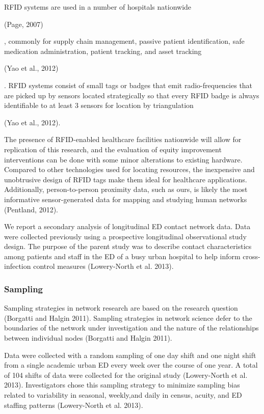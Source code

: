 \documentclass[
]{article}
\begin{document}
RFID systems are used in a number of hospitals nationwide

(Page, 2007)

, commonly for supply chain management, passive patient identification,
safe medication administration, patient tracking, and asset tracking

(Yao et al., 2012)

. RFID systems consist of small tags or badges that emit
radio-frequencies that are picked up by sensors located strategically so
that every RFID badge is always identifiable to at least 3 sensors for
location by triangulation

(Yao et al., 2012).

The presence of RFID-enabled healthcare facilities nationwide will allow
for replication of this research, and the evaluation of equity
improvement interventions can be done with some minor alterations to
existing hardware. Compared to other technologies used for locating
resources, the inexpensive and unobtrusive design of RFID tags make them
ideal for healthcare applications. Additionally, person-to-person
proximity data, such as ours, is likely the most informative
sensor-generated data for mapping and studying human networks (Pentland,
2012).

We report a secondary analysis of longitudinal ED contact network data.
Data were collected previously using a prospective longitudinal
observational study design. The purpose of the parent study was to
describe contact characteristics among patients and staff in the ED of a
busy urban hospital to help inform cross-infection control measures
(Lowery-North et al. 2013).

\hypertarget{sampling}{%
\subsubsection{Sampling}\label{sampling}}

Sampling strategies in network research are based on the research
question (Borgatti and Halgin 2011). Sampling strategies in network
science defer to the boundaries of the network under investigation and
the nature of the relationships between individual nodes (Borgatti and
Halgin 2011).

Data were collected with a random sampling of one day shift and one
night shift from a single academic urban ED every week over the course
of one year. A total of 104 shifts of data were collected for the
original study (Lowery-North et al. 2013). Investigators chose this
sampling strategy to minimize sampling bias related to variability in
seasonal, weekly,and daily in census, acuity, and ED staffing patterns
(Lowery-North et al. 2013).
\end{document}
